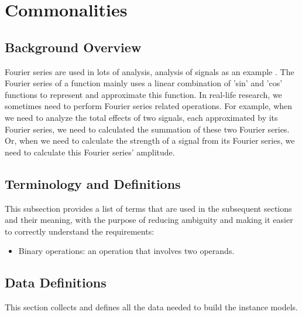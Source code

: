 \documentclass[12pt]{article}
\begin{document}
\section{Commonalities}\label{Sc:CA}

\subsection{Background Overview} \label{Sbsc:CA-Background}
Fourier series are used in lots of analysis, analysis of signals as an example \cite{papoulis1977signal}. The Fourier series of a function mainly uses a linear combination of 'sin' and 'cos' functions to represent and approximate this function. In real-life research, we sometimes need to perform Fourier series related operations. For example, when we need to analyze the total effects of two signals, each approximated by its Fourier series, we need to calculated the summation of these two Fourier series. Or, when we need to calculate the strength of a signal from its Fourier series, we need to calculate this Fourier series' amplitude.
\subsection{Terminology and  Definitions}

This subsection provides a list of terms that are used in the subsequent
sections and their meaning, with the purpose of reducing ambiguity and making it
easier to correctly understand the requirements:

\begin{itemize}

\item Binary operations: an operation that involves two operands.

\end{itemize}
\subsection{Data Definitions} \label{sec_datadef}

This section collects and defines all the data needed to build the instance
models.
~\newline
\end{document}
